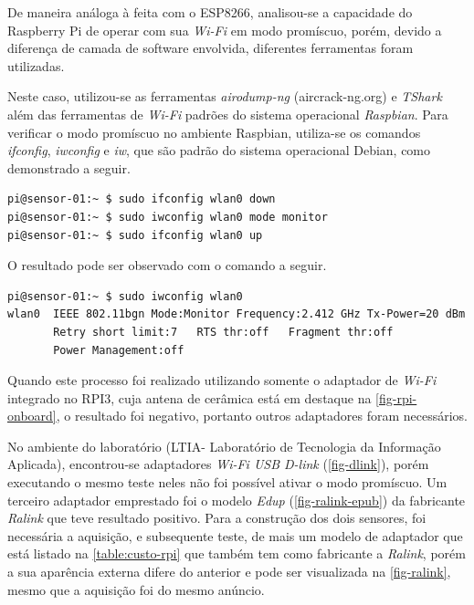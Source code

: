 De maneira análoga à feita com o ESP8266, analisou-se a capacidade do Raspberry Pi
de operar com sua \emph{Wi-Fi} em modo promíscuo, porém, devido a diferença de camada
de software envolvida, diferentes ferramentas foram utilizadas.

Neste caso, utilizou-se as ferramentas \emph{airodump-ng} (aircrack-ng.org) e \emph{TShark} além das ferramentas de
\emph{Wi-Fi} padrões do sistema operacional \emph{Raspbian}. Para verificar o modo
promíscuo no ambiente Raspbian, utiliza-se os comandos \emph{ifconfig},
\emph{iwconfig} e \emph{iw}, que são padrão do sistema operacional Debian, como
demonstrado a seguir.

\begin{lstlisting}[language=bash,caption={Ativação do modo monitor},label=code-iw-monitor]
pi@sensor-01:~ $ sudo ifconfig wlan0 down
pi@sensor-01:~ $ sudo iwconfig wlan0 mode monitor
pi@sensor-01:~ $ sudo ifconfig wlan0 up
\end{lstlisting}

O resultado pode ser observado com o comando a seguir.

\begin{lstlisting}[language=bash,caption={iwconfig com modo monitor},label=code-check-monitor]
pi@sensor-01:~ $ sudo iwconfig wlan0
wlan0  IEEE 802.11bgn Mode:Monitor Frequency:2.412 GHz Tx-Power=20 dBm
	   Retry short limit:7   RTS thr:off   Fragment thr:off
       Power Management:off
\end{lstlisting}

Quando este processo foi realizado utilizando somente o adaptador de \emph{Wi-Fi}
integrado no RPI3, cuja antena de cerâmica está em destaque na
\autoref{fig-rpi-onboard}, o resultado foi negativo, portanto outros adaptadores
foram necessários.

No ambiente do laboratório (LTIA- Laboratório de Tecnologia da Informação Aplicada),
encontrou-se adaptadores \emph{Wi-Fi USB D-link}
(\autoref{fig-dlink}), porém executando o mesmo teste neles não foi possível
ativar o modo promíscuo. Um terceiro adaptador emprestado foi o modelo \emph{Edup} (\autoref{fig-ralink-epub}) da
fabricante \emph{Ralink} que teve resultado
positivo. Para a construção dos dois sensores, foi necessária a aquisição, e
subsequente teste, de mais um modelo de adaptador que está listado na
\autoref{table:custo-rpi} que também tem como fabricante a \emph{Ralink}, porém a sua
aparência externa difere do anterior e pode ser visualizada na
\autoref{fig-ralink}, mesmo que a aquisição foi do mesmo anúncio.

